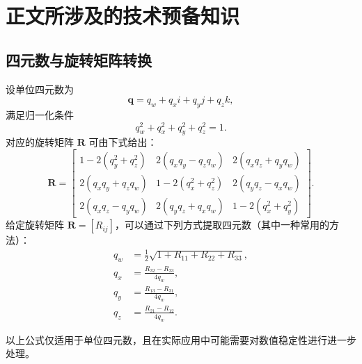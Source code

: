 
\chapter{正文所涉及的技术预备知识}

\section{四元数与旋转矩阵转换}
\label{appendix:quat}
设单位四元数为
\begin{equation}
\symbf{q} = q_w + q_x i + q_y j + q_z k,
\end{equation}
满足归一化条件
\begin{equation}
q_w^2 + q_x^2 + q_y^2 + q_z^2 = 1.
\end{equation}
对应的旋转矩阵 \(\symbf{R}\) 可由下式给出：
\begin{equation}
  \symbf{R} = \begin{bmatrix}
1 - 2(q_y^2 + q_z^2) & 2(q_xq_y - q_zq_w) & 2(q_xq_z + q_yq_w) \\
2(q_xq_y + q_zq_w) & 1 - 2(q_x^2 + q_z^2) & 2(q_yq_z - q_xq_w) \\
2(q_xq_z - q_yq_w) & 2(q_yq_z + q_xq_w) & 1 - 2(q_x^2 + q_y^2)
\end{bmatrix}.
\end{equation}
给定旋转矩阵 \(\symbf{R} = [R_{ij}]\)，可以通过下列方式提取四元数（其中一种常用的方法）：
\begin{align}
  q_w &= \frac{1}{2}\sqrt{1 + R_{11} + R_{22} + R_{33}},\\
  q_x &= \frac{R_{32} - R_{23}}{4q_w},\\
  q_y &= \frac{R_{13} - R_{31}}{4q_w},\\
  q_z &= \frac{R_{21} - R_{12}}{4q_w}.
\end{align}

以上公式仅适用于单位四元数，且在实际应用中可能需要对数值稳定性进行进一步处理。



